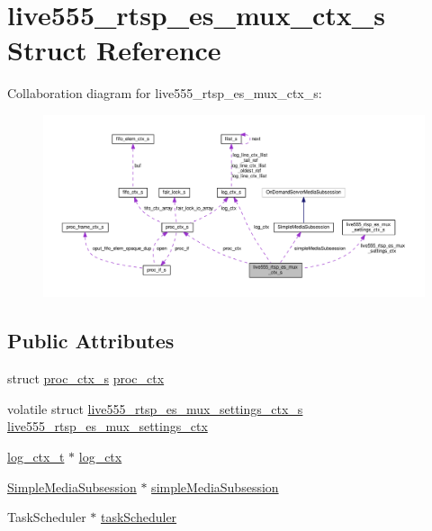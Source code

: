 \hypertarget{structlive555__rtsp__es__mux__ctx__s}{}\section{live555\+\_\+rtsp\+\_\+es\+\_\+mux\+\_\+ctx\+\_\+s Struct Reference}
\label{structlive555__rtsp__es__mux__ctx__s}


Collaboration diagram for live555\+\_\+rtsp\+\_\+es\+\_\+mux\+\_\+ctx\+\_\+s\+:\nopagebreak
\begin{figure}[H]
\begin{center}
\leavevmode
\includegraphics[width=350pt]{structlive555__rtsp__es__mux__ctx__s__coll__graph}
\end{center}
\end{figure}
\subsection*{Public Attributes}
\begin{DoxyCompactItemize}
\item 
struct \hyperlink{structproc__ctx__s}{proc\+\_\+ctx\+\_\+s} \hyperlink{structlive555__rtsp__es__mux__ctx__s_ad52255c06dde0cfdd45ec10c481fecb5}{proc\+\_\+ctx}
\item 
volatile struct \hyperlink{structlive555__rtsp__es__mux__settings__ctx__s}{live555\+\_\+rtsp\+\_\+es\+\_\+mux\+\_\+settings\+\_\+ctx\+\_\+s} \hyperlink{structlive555__rtsp__es__mux__ctx__s_aad4b5b5b7f6728e513332025cdb5ad84}{live555\+\_\+rtsp\+\_\+es\+\_\+mux\+\_\+settings\+\_\+ctx}
\item 
\hyperlink{structlog__ctx__s}{log\+\_\+ctx\+\_\+t} $\ast$ \hyperlink{structlive555__rtsp__es__mux__ctx__s_a17b61ccf1a42eee4efba9cc593c99a5d}{log\+\_\+ctx}
\item 
\hyperlink{classSimpleMediaSubsession}{Simple\+Media\+Subsession} $\ast$ \hyperlink{structlive555__rtsp__es__mux__ctx__s_a066290959c314f7c0c51532b3124d644}{simple\+Media\+Subsession}
\item 
Task\+Scheduler $\ast$ \hyperlink{structlive555__rtsp__es__mux__ctx__s_a75ac022442f9544fc6a0d190257e37ee}{task\+Scheduler}
\end{DoxyCompactItemize}


